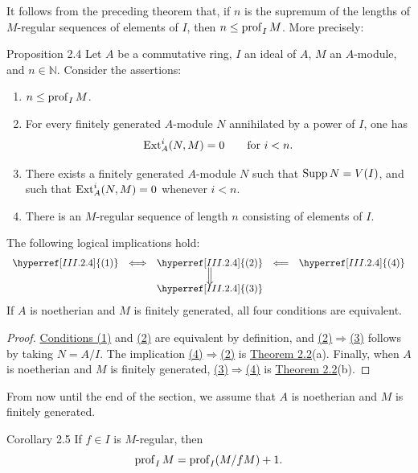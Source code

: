 It follows from the preceding theorem that, if $n$ is the supremum of the
lengths of $M$-regular sequences of elements of $I$, then
$n\le\operatorname{prof}_I M$. More precisely:

\begin{sgastatement}{Proposition 2.4}
Let $A$ be a commutative ring, $I$ an ideal of $A$, $M$ an $A$-module,
and $n\in\mathbb N$. Consider the assertions:
\begin{enumerate}[label=\textup{(\arabic*)},leftmargin=2.7em]
\item $n\le\operatorname{prof}_I M$.
\item For every finitely generated $A$-module $N$ annihilated by a power
of $I$, one has
\[
  \operatorname{Ext}_A^i(N,M)=0\qquad\text{for }i<n.
\]
\item There exists a finitely generated $A$-module $N$ such that
$\operatorname{Supp} N=V(I)$, and such that $\operatorname{Ext}_A^i(N,M)=0$ whenever $i<n$.
\item There is an $M$-regular sequence of length $n$ consisting of
elements of $I$.
\end{enumerate}
The following logical implications hold:
\[
\begin{array}{ccccc}
\hyperref[III.2.4]{(1)}&\Longleftrightarrow&\hyperref[III.2.4]{(2)}&\Longleftarrow&\hyperref[III.2.4]{(4)}\\[-0.2em]
&&\Big\Downarrow&&\\[-0.2em]
&&\hyperref[III.2.4]{(3)}&&
\end{array}
\]
If $A$ is noetherian and $M$ is finitely generated, all four conditions are
equivalent.
\end{sgastatement}

\begin{proof}
\hyperref[III.2.4]{Conditions (1)} and \hyperref[III.2.4]{(2)} are equivalent by definition, and
\hyperref[III.2.4]{(2)}$\Rightarrow$\hyperref[III.2.4]{(3)} follows by taking $N=A/I$. The implication
\hyperref[III.2.4]{(4)}$\Rightarrow$\hyperref[III.2.4]{(2)} is \hyperref[III.2.2]{Theorem 2.2}(a). Finally, when $A$ is noetherian and
$M$ is finitely generated, \hyperref[III.2.4]{(3)}$\Rightarrow$\hyperref[III.2.4]{(4)} is \hyperref[III.2.2]{Theorem 2.2}(b).
\end{proof}

From now until the end of the section, we assume that $A$ is
noetherian and $M$ is finitely generated.

\begin{sgastatement}{Corollary 2.5}
If $f\in I$ is $M$-regular, then
\[
  \operatorname{prof}_I M=\operatorname{prof}_I(M/fM)+1.
\]
\end{sgastatement}


